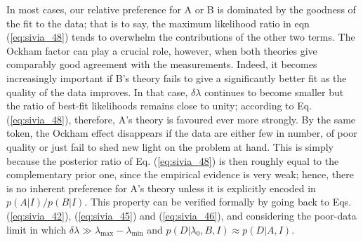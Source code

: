 \documentclass[%
oneside,                 %
final,                   %
10pt]{article}
\begin{document}
In most cases, our relative preference for A or B is dominated by the goodness of the fit to the data; that is to say, the maximum likelihood ratio in eqn (\ref{eq:sivia_48}) tends to overwhelm the contributions of the other two terms. The Ockham factor can play a crucial role, however, when both theories give comparably good agreement with the measurements. Indeed, it becomes increasingly important if B’s theory fails to give a significantly better fit as the quality of the data improves. In that case, $\delta\lambda$ continues to become smaller but the ratio of best-fit likelihoods remains close to unity; according to Eq. (\ref{eq:sivia_48}), therefore, A’s theory is favoured ever more strongly. By the same token, the Ockham effect disappears if the data are either few in number, of poor quality or just fail to shed new light on the problem at hand. This is simply because the posterior ratio of Eq. (\ref{eq:sivia_48}) is then roughly equal to the complementary prior one, since the empirical evidence is very weak; hence, there is no inherent preference for A’s theory unless it is explicitly encoded in $p(A|I)/p(B|I)$. This property can be verified formally by going back to Eqs. (\ref{eq:sivia_42}), (\ref{eq:sivia_45}) and (\ref{eq:sivia_46}), and considering the poor-data limit in which 
$\delta\lambda \gg \lambda_\mathrm{max}-\lambda_\mathrm{min}$ and $p(D|\lambda_0,B,I) \approx p(D|A,I)$.
\end{document}
